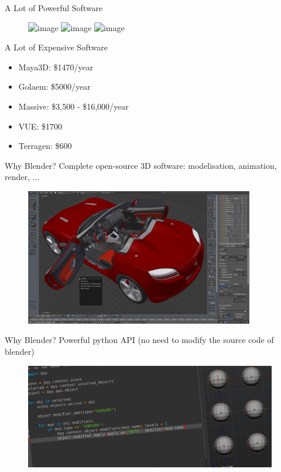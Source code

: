 \documentclass{beamer}
\begin{document}
\begin{frame}{A Lot of Powerful Software}


\begin{figure}
  \includegraphics<1>[width=.95\textwidth]{golaem.jpg}
  \includegraphics<2>[width=.95\textwidth]{massive.jpg}
  \includegraphics<3>[width=.95\textwidth]{VUE.jpg}
  \caption*{}
\end{figure}

\end{frame}

\begin{frame}{A Lot of Expensive Software}
  \begin{itemize}
    \item Maya3D: \$1470/year
    \item Golaem: \$5000/year
    \item Massive: \$3,500 - \$16,000/year
    \item VUE: \$1700
    \item Terragen: \$600
  \end{itemize}
\end{frame}

\begin{frame}{Why Blender?}
  Complete open-source 3D software: modelisation, animation, render, ...
    \begin{figure}
        \includegraphics[width=10cm]{blender_mod}
    \end{figure}
\end{frame}

\begin{frame}{Why Blender?}
  Powerful python API (no need to modify the source code of blender)
  \begin{figure}
        \includegraphics[width=11cm]{blender_script}
    \end{figure}
\end{frame}
\end{document}
